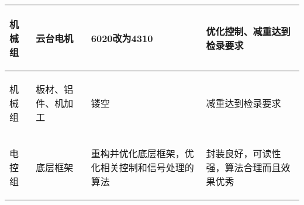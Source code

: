\begin{longtable}{ p{1.5cm} | p{3cm} | p{6cm} | p{4.3cm} |}
    \hline

        \begin{center}
            机械组
        \end{center}&
        \begin{center}
            云台电机
        \end{center}&
        \begin{center}
            6020改为4310
        \end{center}&
        \begin{center}
            优化控制、减重达到检录要求
        \end{center}\\
        
    \hline
    
        \begin{center}
            机械组
        \end{center} &
        \begin{center}
            板材、铝件、机加工
        \end{center} &
        \begin{center}
            镂空
        \end{center} &
        \begin{center}
            减重达到检录要求
        \end{center} \\

    \hline
    
        \begin{center}
            电控组
        \end{center} &
        \begin{center}
            底层框架
        \end{center} &
        \begin{center}
            重构并优化底层框架，优化相关控制和信号处理的算法
        \end{center} &
        \begin{center}
            封装良好，可读性强，算法合理而且效果优秀
        \end{center} \\

    \hline


\end{longtable}
